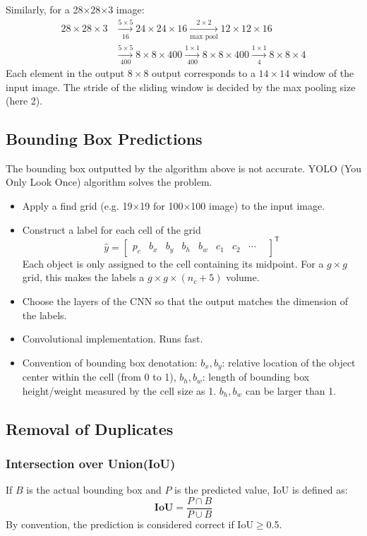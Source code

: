 Similarly, for a 28$\times$28$\times$3 image: 
\begin{align*}
  28\times 28\times 3&\xrightarrow[16]{5\times 5}24\times 24\times 16\xrightarrow[\text{max pool}]{2\times 2}12\times 12\times 16\\
  &\xrightarrow[400]{5\times 5}8\times 8\times 400\xrightarrow[400]{1\times 1}8\times 8\times 400\xrightarrow[4]{1\times 1}8\times 8\times 4
\end{align*}
Each element in the output $8\times 8$ output corresponds to a $14\times 14$ window of the input image. The stride of the sliding window is decided by the max pooling size (here 2). 
\subsection{Bounding Box Predictions}
The bounding box outputted by the algorithm above is not accurate. YOLO (You Only Look Once) algorithm solves the problem. 
\begin{itemize}
\item Apply a find grid (e.g. 19$\times$19 for 100$\times$100 image) to the input image.
\item Construct a label for each cell of the grid
\[\hat{y}=\begin{bmatrix}
  p_c & b_x & b_y & b_h & b_w & c_1 & c_2 & \cdots & 
\end{bmatrix}^{\mathsf{T}}\]
Each object is only assigned to the cell containing its midpoint. For a $g\times g$ grid, this makes the labels a $g\times g\times \left(n_c+5\right)$ volume.
\item Choose the layers of the CNN so that the output matches the dimension of the labels.
\item Convolutional implementation. Runs fast.
\item Convention of bounding box denotation:  $b_x,b_y$: relative location of the object center within the cell (from 0 to 1), $b_h,b_w$: length of bounding box height/weight measured by the cell size as 1. $b_h, b_w$ can be larger than 1. 
\end{itemize}
\subsection{Removal of Duplicates}
\subsubsection{Intersection over Union(IoU)}
If $B$ is the actual bounding box and $P$ is the predicted value, IoU is defined as: 
\[\mathbf{IoU}=\frac{P\cap B}{P\cup B}\]
By convention, the prediction is considered correct if IoU$\ge$0.5.
